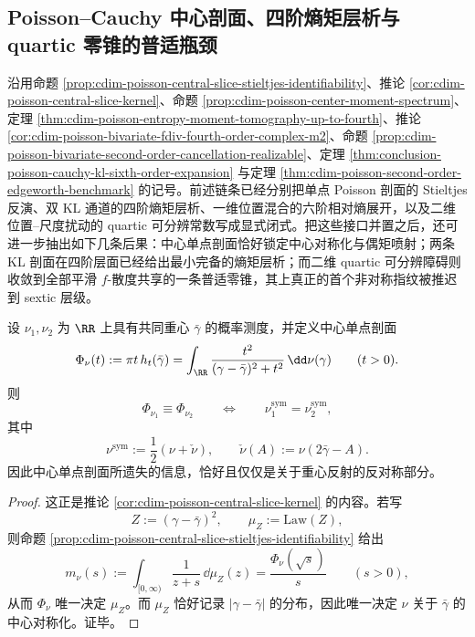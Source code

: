 \subsection{Poisson--Cauchy 中心剖面、四阶熵矩层析与 quartic 零锥的普适瓶颈}\label{subsec:conclusion-poisson-cauchy-centralslice-nullcone-sextic-tomography}
沿用命题 \ref{prop:cdim-poisson-central-slice-stieltjes-identifiability}、推论 \ref{cor:cdim-poisson-central-slice-kernel}、命题 \ref{prop:cdim-poisson-center-moment-spectrum}、定理 \ref{thm:cdim-poisson-entropy-moment-tomography-up-to-fourth}、推论 \ref{cor:cdim-poisson-bivariate-fdiv-fourth-order-complex-m2}、命题 \ref{prop:cdim-poisson-bivariate-second-order-cancellation-realizable}、定理 \ref{thm:conclusion-poisson-cauchy-kl-sixth-order-expansion} 与定理 \ref{thm:cdim-poisson-second-order-edgeworth-benchmark} 的记号。前述链条已经分别把单点 Poisson 剖面的 Stieltjes 反演、双 KL 通道的四阶熵矩层析、一维位置混合的六阶相对熵展开，以及二维位置--尺度扰动的 quartic 可分辨常数写成显式闭式。把这些接口并置之后，还可进一步抽出如下几条后果：中心单点剖面恰好锁定中心对称化与偶矩喷射；两条 KL 剖面在四阶层面已经给出最小完备的熵矩层析；而二维 quartic 可分辨障碍则收敛到全部平滑 \(f\)-散度共享的一条普适零锥，其上真正的首个非对称指纹被推迟到 sextic 层级。

\begin{theorem}[中心单点剖面的等价关系恰为中心对称化]\label{thm:conclusion-poisson-central-slice-symmetrization-equivalence}
设 \(\nu_1,\nu_2\) 为 \(\RR\) 上具有共同重心 \(\bar\gamma\) 的概率测度，并定义中心单点剖面
\[
\Phi_{\nu}(t):=\pi t\,h_t(\bar\gamma)
=
\int_{\RR}\frac{t^2}{(\gamma-\bar\gamma)^2+t^2}\,\dd\nu(\gamma)
\qquad (t>0).
\]
则
\[
\Phi_{\nu_1}\equiv \Phi_{\nu_2}
\qquad\Longleftrightarrow\qquad
\nu_1^{\mathrm{sym}}=\nu_2^{\mathrm{sym}},
\]
其中
\[
\nu^{\mathrm{sym}}:=\frac12(\nu+\check\nu),
\qquad
\check\nu(A):=\nu(2\bar\gamma-A).
\]
因此中心单点剖面所遗失的信息，恰好且仅仅是关于重心反射的反对称部分。
\end{theorem}
\begin{proof}
这正是推论 \ref{cor:cdim-poisson-central-slice-kernel} 的内容。若写
\[
Z:=(\gamma-\bar\gamma)^2,
\qquad
\mu_Z:=\mathrm{Law}(Z),
\]
则命题 \ref{prop:cdim-poisson-central-slice-stieltjes-identifiability} 给出
\[
m_\nu(s):=\int_{[0,\infty)}\frac{1}{z+s}\,\dd\mu_Z(z)
=\frac{\Phi_\nu(\sqrt s)}{s}
\qquad (s>0),
\]
从而 \(\Phi_\nu\) 唯一决定 \(\mu_Z\)。而 \(\mu_Z\) 恰好记录 \(|\gamma-\bar\gamma|\) 的分布，因此唯一决定 \(\nu\) 关于 \(\bar\gamma\) 的中心对称化。证毕。
\end{proof}

